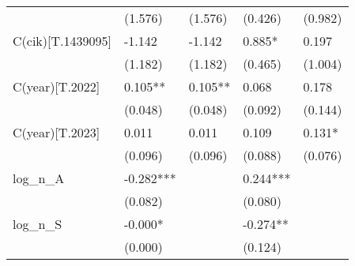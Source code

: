 \begin{table}
\begin{center}
\begin{tabular}{lllll}
                  & (1.576)                                   & (1.576)                                         & (0.426)                                 & (0.982)                                                \\
C(cik)[T.1439095] & -1.142                                    & -1.142                                          & 0.885*                                  & 0.197                                                  \\
                  & (1.182)                                   & (1.182)                                         & (0.465)                                 & (1.004)                                                \\
C(year)[T.2022]   & 0.105**                                   & 0.105**                                         & 0.068                                   & 0.178                                                  \\
                  & (0.048)                                   & (0.048)                                         & (0.092)                                 & (0.144)                                                \\
C(year)[T.2023]   & 0.011                                     & 0.011                                           & 0.109                                   & 0.131*                                                 \\
                  & (0.096)                                   & (0.096)                                         & (0.088)                                 & (0.076)                                                \\
log\_n\_A         & -0.282***                                 &                                                 & 0.244***                                &                                                        \\
                  & (0.082)                                   &                                                 & (0.080)                                 &                                                        \\
log\_n\_S         & -0.000*                                   &                                                 & -0.274**                                &                                                        \\
                  & (0.000)                                   &                                                 & (0.124)                                 &                                                        \\

\end{tabular}
\end{center}
\end{table}
